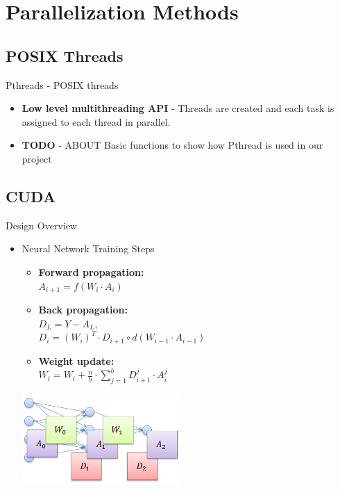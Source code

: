 \section{Parallelization Methods}
    \subsection{POSIX Threads}
        \begin{frame}{Pthreads - POSIX threads}
            \begin{itemize}
                \item {
                    \textbf{Low level multithreading API} - Threads are created and each task is assigned to each thread in parallel.
                    }
                \item {
                    \textbf{TODO} - ABOUT Basic functions to show how Pthread is used in our project
                    }
            \end{itemize}
        \end{frame}
        

\subsection{CUDA}
\begin{frame}{Design Overview}

\begin{itemize}

\item{ Neural Network Training Steps }
\begin{itemize}
\item{\textbf{Forward propagation:}  \\$A_{i+1} = f(W_{i} \cdot A_{i})$}
\item{\textbf{Back propagation:}  \\$D_L =Y - A_L$,\\ $D_i = (W_{i})^{T}\cdot D_{i+1} \circ d(W_{i-1} \cdot A_{i-1})$}
\item{\textbf{Weight update:} \\$W_{i} = W_{i} + \frac{n}{b} \cdot \sum_{j=1}^{b} D_{i+1}^{j} \cdot A_{i}^j$}
\end{itemize}

\begin{center}
\includegraphics[width=2.4in]{gpu_neural_net_data.png}
\end{center}

\end{itemize}

\end{frame}

